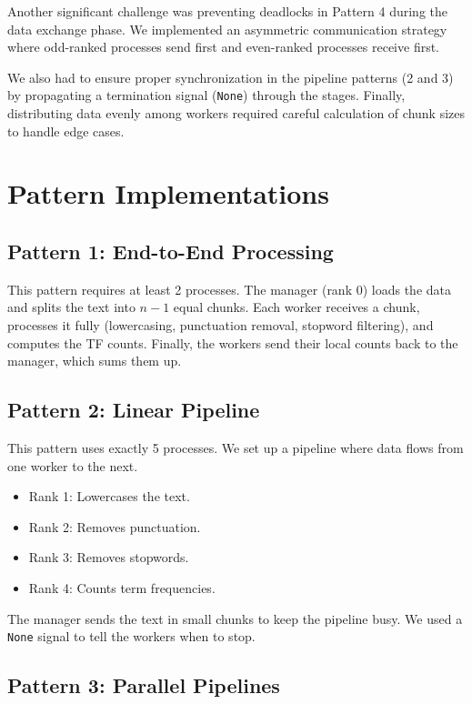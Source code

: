 \documentclass[12pt,a4paper]{article}
\begin{document}
Another significant challenge was preventing deadlocks in Pattern 4 during the data exchange phase. We implemented an asymmetric communication strategy where odd-ranked processes send first and even-ranked processes receive first.

We also had to ensure proper synchronization in the pipeline patterns (2 and 3) by propagating a termination signal (\texttt{None}) through the stages. Finally, distributing data evenly among workers required careful calculation of chunk sizes to handle edge cases.

\section{Pattern Implementations}

\subsection{Pattern 1: End-to-End Processing}

This pattern requires at least 2 processes. The manager (rank 0) loads the data and splits the text into $n-1$ equal chunks. Each worker receives a chunk, processes it fully (lowercasing, punctuation removal, stopword filtering), and computes the TF counts. Finally, the workers send their local counts back to the manager, which sums them up.

\subsection{Pattern 2: Linear Pipeline}

This pattern uses exactly 5 processes. We set up a pipeline where data flows from one worker to the next.
\begin{itemize}
    \item Rank 1: Lowercases the text.
    \item Rank 2: Removes punctuation.
    \item Rank 3: Removes stopwords.
    \item Rank 4: Counts term frequencies.
\end{itemize}
The manager sends the text in small chunks to keep the pipeline busy. We used a \texttt{None} signal to tell the workers when to stop.

\subsection{Pattern 3: Parallel Pipelines}
\end{document}
